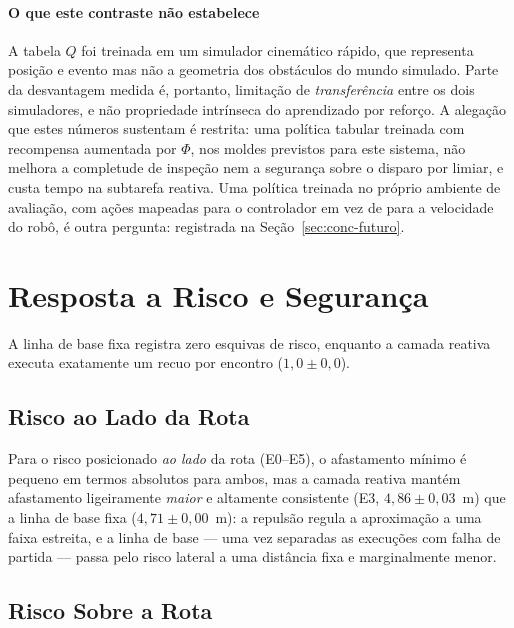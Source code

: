 \paragraph*{O que este contraste não estabelece} A tabela $Q$ foi treinada em um
simulador cinemático rápido, que representa posição e evento mas não a geometria dos
obstáculos do mundo simulado. Parte da desvantagem medida é, portanto, limitação de
\emph{transferência} entre os dois simuladores, e não propriedade intrínseca do
aprendizado por reforço. A alegação que estes números sustentam é restrita: uma
política tabular treinada com recompensa aumentada por $\Phi$, nos moldes previstos
para este sistema, não melhora a completude de inspeção nem a segurança sobre o
disparo por limiar, e custa tempo na subtarefa reativa. Uma política treinada no
próprio ambiente de avaliação, com ações mapeadas para o controlador em vez de para a
velocidade do robô, é outra pergunta: registrada na Seção~\ref{sec:conc-futuro}.

\section{Resposta a Risco e Segurança}
\label{sec:res-seguranca}

A linha de base fixa registra zero esquivas de risco, enquanto a camada reativa
executa exatamente um recuo por encontro ($1{,}0\pm0{,}0$).

\subsection{Risco ao Lado da Rota}

Para o risco posicionado \emph{ao lado} da rota (E0--E5), o afastamento mínimo é
pequeno em termos absolutos para ambos, mas a camada reativa mantém afastamento
ligeiramente \emph{maior} e altamente consistente (E3, $4{,}86\pm0{,}03$~m) que a
linha de base fixa ($4{,}71\pm0{,}00$~m): a repulsão regula a aproximação a uma faixa
estreita, e a linha de base --- uma vez separadas as execuções com falha de partida
--- passa pelo risco lateral a uma distância fixa e marginalmente menor.

\subsection{Risco Sobre a Rota}


